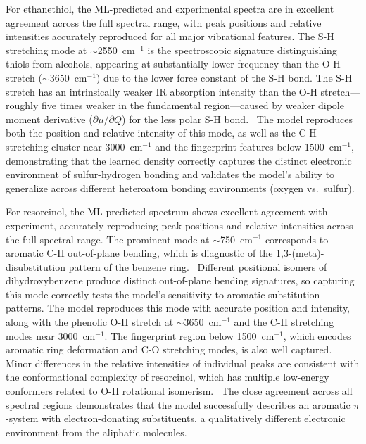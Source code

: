 \documentclass[12pt]{article}
\begin{document}
For ethanethiol, the ML-predicted and experimental spectra are in excellent agreement across the full spectral range, with peak positions and relative intensities accurately reproduced for all major vibrational features.
The S-H stretching mode at $\sim$2550~cm$^{-1}$ is the spectroscopic signature distinguishing thiols from alcohols, appearing at substantially lower frequency than the O-H stretch ($\sim$3650~cm$^{-1}$) due to the lower force constant of the S-H bond.
The S-H stretch has an intrinsically weaker IR absorption intensity than the O-H stretch---roughly five times weaker in the fundamental region---caused by weaker dipole moment derivative ($\partial\mu/\partial Q$) for the less polar S-H bond.~\cite{kuodis2020reflection}
The model reproduces both the position and relative intensity of this mode, as well as the C-H stretching cluster near 3000~cm$^{-1}$ and the fingerprint features below 1500~cm$^{-1}$, demonstrating that the learned density correctly captures the distinct electronic environment of sulfur-hydrogen bonding and validates the model's ability to generalize across different heteroatom bonding environments (oxygen vs.\ sulfur).

For resorcinol, the ML-predicted spectrum shows excellent agreement with experiment, accurately reproducing peak positions and relative intensities across the full spectral range.
The prominent mode at $\sim$750~cm$^{-1}$ corresponds to aromatic C-H out-of-plane bending, which is diagnostic of the 1,3-(meta)-disubstitution pattern of the benzene ring.~\cite{chemes2021assessment} Different positional isomers of dihydroxybenzene produce distinct out-of-plane bending signatures, so capturing this mode correctly tests the model's sensitivity to aromatic substitution patterns.
The model reproduces this mode with accurate position and intensity, along with the phenolic O-H stretch at $\sim$3650~cm$^{-1}$ and the C-H stretching modes near 3000~cm$^{-1}$.
The fingerprint region below 1500~cm$^{-1}$, which encodes aromatic ring deformation and C-O stretching modes, is also well captured.
Minor differences in the relative intensities of individual peaks are consistent with the conformational complexity of resorcinol, which has multiple low-energy conformers related to O-H rotational isomerism.~\cite{pitsevich2023torsional}
The close agreement across all spectral regions demonstrates that the model successfully describes an aromatic $\pi$-system with electron-donating substituents, a qualitatively different electronic environment from the aliphatic molecules.
\end{document}
